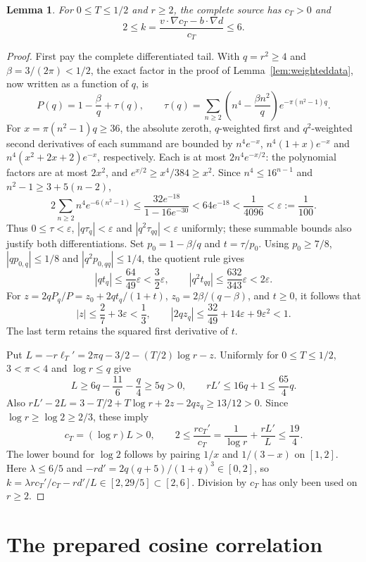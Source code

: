 \documentclass[11pt]{article}
\numberwithin{equation}{section}
\newtheorem{lemma}[theorem]{Lemma}
\begin{document}
\begin{lemma}
For $0\le T\le1/2$ and $r\ge2$, the complete source has $c_T>0$ and
\[
 2\le
 k=\frac{v\cdot\nabla c_T-b\cdot\nabla d}{c_T}
 \le6.
\]
\end{lemma}
\begin{proof}
First pay the complete differentiated tail. With $q=r^2\ge4$ and
$\beta=3/(2\pi)<1/2$, the exact factor in the proof of
Lemma~\ref{lem:weighteddata}, now written as a function of $q$, is
\[
 P(q)=1-\frac\beta q+\tau(q),\qquad
 \tau(q)=\sum_{n\ge2}\left(n^4-\frac{\beta n^2}{q}\right)
                       e^{-\pi(n^2-1)q}.
\]
For $x=\pi(n^2-1)q\ge36$, the absolute zeroth, $q$-weighted first
and $q^2$-weighted second derivatives of each summand are bounded by
$n^4e^{-x}$, $n^4(1+x)e^{-x}$ and
$n^4(x^2+2x+2)e^{-x}$, respectively. Each is at most
$2n^4e^{-x/2}$: the polynomial factors are at most $2x^2$, and
$e^{x/2}\ge x^4/384\ge x^2$.
Since $n^4\le16^{n-1}$ and $n^2-1\ge3+5(n-2)$,
\[
 2\sum_{n\ge2}n^4e^{-6(n^2-1)}
 \le\frac{32e^{-18}}{1-16e^{-30}}
 <64e^{-18}<\frac1{4096}<\varepsilon:=\frac1{100}.
\]
Thus $0\le\tau<\varepsilon$, $|q\tau_q|<\varepsilon$ and
$|q^2\tau_{qq}|<\varepsilon$ uniformly; these summable bounds also
justify both differentiations. Set $p_0=1-\beta/q$ and $t=\tau/p_0$.
Using $p_0\ge7/8$, $|qp_{0,q}|\le1/8$ and
$|q^2p_{0,qq}|\le1/4$, the quotient rule gives
\[
 |qt_q|\le\frac{64}{49}\varepsilon<\frac32\varepsilon,
 \qquad |q^2t_{qq}|\le\frac{632}{343}\varepsilon<2\varepsilon.
\]
For $z=2qP_q/P=z_0+2qt_q/(1+t)$, $z_0=2\beta/(q-\beta)$,
and $t\ge0$, it follows that
\[
 |z|\le\frac27+3\varepsilon<\frac13,\qquad
 |2qz_q|\le\frac{32}{49}+14\varepsilon+9\varepsilon^2<1.
\]
The last term retains the squared first derivative of $t$.

Put $L=-r\ell_T'=2\pi q-3/2-(T/2)\log r-z$. Uniformly for
$0\le T\le1/2$, $3<\pi<4$ and $\log r\le q$ give
\[
 L\ge6q-\frac{11}{6}-\frac q4\ge5q>0,\qquad
 rL'\le16q+1\le\frac{65}{4}q.
\]
Also $rL'-2L=3-T/2+T\log r+2z-2qz_q\ge13/12>0$.
Since $\log r\ge\log2\ge2/3$, these imply
\[
 c_T=(\log r)L>0,\qquad
 2\le\frac{rc_T'}{c_T}
      =\frac1{\log r}+\frac{rL'}L\le\frac{19}{4}.
\]
The lower bound for $\log2$ follows by pairing $1/x$ and $1/(3-x)$
on $[1,2]$. Here $\lambda\le6/5$ and
$-rd'=2q(q+5)/(1+q)^3\in[0,2]$, so
$k=\lambda rc_T'/c_T-rd'/L\in[2,29/5]\subset[2,6]$.
Division by $c_T$ has only been used on $r\ge2$.

\end{proof}

\section{The prepared cosine correlation}\label{app:correlation}
\end{document}
